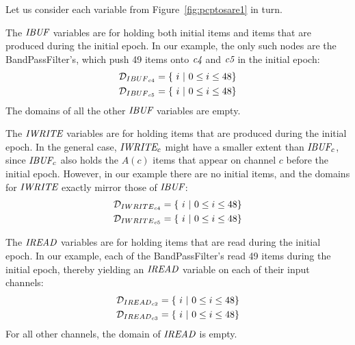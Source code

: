 Let us consider each variable from Figure~\ref{fig:pcptosare1} in turn.


The $\mbox{\it IBUF}$ variables are for holding both initial items and items
that are produced during the initial epoch.  In our example, the only
such nodes are the BandPassFilter's, which push 49 items onto
$\mbox{\it c4}$ and $\mbox{\it c5}$ in the initial epoch:
\begin{align*}
{\cal D}_{{IBUF}_{c4}} &= \{~i~|~0 \le i \le 48\} \\
{\cal D}_{{IBUF}_{c5}} &= \{~i~|~0 \le i \le 48\}
\end{align*}
The domains of all the other $\mbox{\it IBUF}$ variables are empty.


The $\mbox{\it IWRITE}$ variables are for holding items that are produced
during the initial epoch.  In the general case, $\mbox{\it IWRITE}_c$ might
have a smaller extent than $\mbox{\it IBUF}_c$, since $\mbox{\it IBUF}_c$ also
holds the $A(c)$ items that appear on channel $c$ before the initial
epoch.  However, in our example there are no initial items, and the
domains for $\mbox{\it IWRITE}$ exactly mirror those of $\mbox{\it IBUF}$:
\begin{align*}
{\cal D}_{{IWRITE}_{c4}} &= \{~i~|~0 \le i \le 48\} \\
{\cal D}_{{IWRITE}_{c5}} &= \{~i~|~0 \le i \le 48\}
\end{align*}


The $\mbox{\it IREAD}$ variables are for holding items that are read during
the initial epoch.  In our example, each of the BandPassFilter's read
49 items during the initial epoch, thereby yielding an $\mbox{\it IREAD}$
variable on each of their input channels:
\begin{align*}
{\cal D}_{{IREAD}_{c2}} &= \{~i~|~0 \le i \le 48 \} \\
{\cal D}_{{IREAD}_{c3}} &= \{~i~|~0 \le i \le 48 \}
\end{align*}
For all other channels, the domain of $\mbox{\it IREAD}$ is empty.


